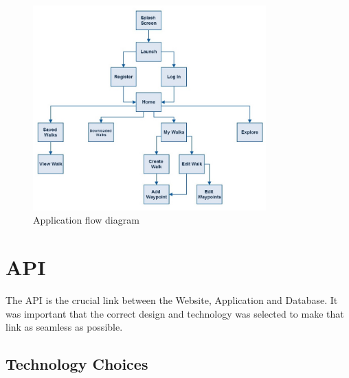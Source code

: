 \documentclass[11pt,a4paper]{report}
\begin{document}
\begin{figure}[H]
    \centering
    \includegraphics[width=0.8\textwidth]{chris/flow}
    \caption{Application flow diagram}
    \label{fig:flow}
\end{figure}

\section{API} 
\label{sec:api-design}

The API is the crucial link between the Website, Application and Database. It was important that the correct design and technology was selected to make that link as seamless as possible. 

\subsection{Technology Choices}
\label{sec:api:techChoices}
\end{document}
